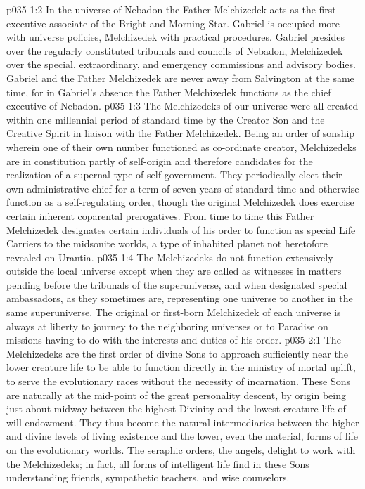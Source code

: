 \vs p035 1:2 In the universe of Nebadon the Father Melchizedek acts as the first executive associate of the Bright and Morning Star. Gabriel is occupied more with universe policies, Melchizedek with practical procedures. Gabriel presides over the regularly constituted tribunals and councils of Nebadon, Melchizedek over the special, extraordinary, and emergency commissions and advisory bodies. Gabriel and the Father Melchizedek are never away from Salvington at the same time, for in Gabriel’s absence the Father Melchizedek functions as the chief executive of Nebadon.
\vs p035 1:3 The Melchizedeks of our universe were all created within one millennial period of standard time by the Creator Son and the Creative Spirit in liaison with the Father Melchizedek. Being an order of sonship wherein one of their own number functioned as co\hyp{}ordinate creator, Melchizedeks are in constitution partly of self\hyp{}origin and therefore candidates for the realization of a supernal type of self\hyp{}government. They periodically elect their own administrative chief for a term of seven years of standard time and otherwise function as a self\hyp{}regulating order, though the original Melchizedek does exercise certain inherent coparental prerogatives. From time to time this Father Melchizedek designates certain individuals of his order to function as special Life Carriers to the midsonite worlds, a type of inhabited planet not heretofore revealed on Urantia.
\vs p035 1:4 The Melchizedeks do not function extensively outside the local universe except when they are called as witnesses in matters pending before the tribunals of the superuniverse, and when designated special ambassadors, as they sometimes are, representing one universe to another in the same superuniverse. The original or first\hyp{}born Melchizedek of each universe is always at liberty to journey to the neighboring universes or to Paradise on missions having to do with the interests and duties of his order.
\vs p035 2:1 The Melchizedeks are the first order of divine Sons to approach sufficiently near the lower creature life to be able to function directly in the ministry of mortal uplift, to serve the evolutionary races without the necessity of incarnation. These Sons are naturally at the mid\hyp{}point of the great personality descent, by origin being just about midway between the highest Divinity and the lowest creature life of will endowment. They thus become the natural intermediaries between the higher and divine levels of living existence and the lower, even the material, forms of life on the evolutionary worlds. The seraphic orders, the angels, delight to work with the Melchizedeks; in fact, all forms of intelligent life find in these Sons understanding friends, sympathetic teachers, and wise counselors.
